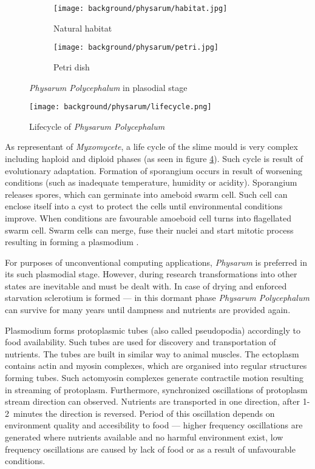 \begin{figure}
  \centering
  \begin{subfigure}{0.45\textwidth}
    \centering
    \texttt{[image: background/physarum/habitat.jpg]}
    \caption{Natural habitat \cite{TODO}}
    \label{figure:bp_habitat}
  \end{subfigure}
  \begin{subfigure}{0.45\textwidth}
    \centering
    \texttt{[image: background/physarum/petri.jpg]}
    \caption{Petri dish}
    \label{figure:bp_petri}
  \end{subfigure}
  \caption{\textit{Physarum Polycephalum} in plasodial stage}
\end{figure}

\begin{figure}
  \centering
  \texttt{[image: background/physarum/lifecycle.png]}
  \caption{Lifecycle of \textit{Physarum Polycephalum} \cite{TODO}}
  \label{figure:bp_lifecycle}
\end{figure}

As representant of \textit{Myxomycete}, a life cycle of the slime mould is very complex including haploid and diploid phases (as seen in figure \ref{figure:bp_lifecycle}). Such cycle is result of evolutionary adaptation. Formation of sporangium occurs in result of worsening conditions (such as inadequate temperature, humidity or acidity). Sporangium releases spores, which can germinate into ameboid swarm cell. Such cell can enclose itself into a cyst to protect the cells until environmental conditions improve. When conditions are favourable amoeboid cell turns into flagellated swarm cell. Swarm cells can merge, fuse their nuclei and start mitotic process resulting in forming a plasmodium \cite{jones2015pattern}.

For purposes of unconventional computing applications, \textit{Physarum} is preferred in its such plasmodial stage. However, during research transformations into other states are inevitable and must be dealt with. In case of drying and enforced starvation sclerotium is formed --- in this dormant phase \textit{Physarum Polycephalum} can survive for many years until dampness and nutrients are provided again.

Plasmodium forms protoplasmic tubes (also called pseudopodia) accordingly to food availability. Such tubes are used for discovery and transportation of nutrients. The tubes are built in similar way to animal muscles. The ectoplasm contains actin and myosin complexes, which are organised into regular structures forming tubes. Such actomyosin complexes generate contractile motion resulting in streaming of protoplasm. Furthermore, synchronized oscillations of protoplasm stream direction can observed. Nutrients are transported in one direction, after 1-2~minutes the direction is reversed. Period of this oscillation depends on environment quality and accesibility to food \cite{wohlfarth1979oscillatory} --- higher frequency oscillations are generated where nutrients available and no harmful environment exist, low frequency oscillations are caused by lack of food or as a result of unfavourable conditions. 

